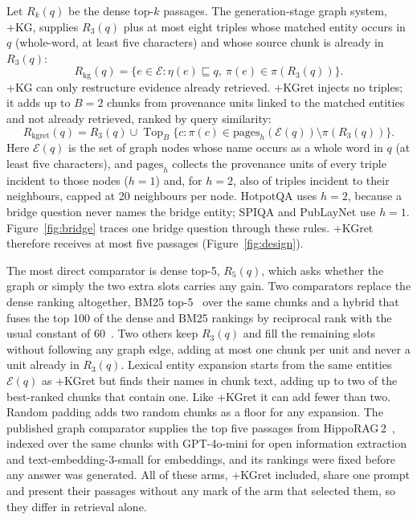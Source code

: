 \documentclass[preprint,12pt]{elsarticle}
\begin{document}
Let $R_k(q)$ be the dense top-$k$ passages. The generation-stage graph system,
+KG, supplies $R_3(q)$ plus at most eight triples whose matched entity occurs in
$q$ (whole-word, at least five characters) and whose source chunk is already
in $R_3(q)$:
\begin{equation}
R_{\text{kg}}(q)=\bigl\{e\in\mathcal{E}:\eta(e)\sqsubseteq q,\ \pi(e)\in\pi(R_3(q))\bigr\}.
\end{equation}
+KG can only restructure evidence already retrieved. +KGret injects no triples;
it adds up to $B=2$ chunks from provenance units linked to the matched
entities and not already retrieved, ranked by query similarity:
\begin{equation}
\label{eq:kgret}
R_{\text{kgret}}(q)=R_3(q)\cup\operatorname{Top}_{B}\bigl\{c:\pi(c)\in\mathrm{pages}_h(\mathcal{E}(q))\setminus\pi(R_3(q))\bigr\}.
\end{equation}
Here $\mathcal{E}(q)$ is the set of graph nodes whose name occurs as a whole
word in $q$ (at least five characters), and $\mathrm{pages}_h$ collects the
provenance units of every triple incident to those nodes ($h=1$) and, for
$h=2$, also of triples incident to their neighbours, capped at 20 neighbours
per node. HotpotQA uses $h=2$, because a bridge question never names the
bridge entity; SPIQA and PubLayNet use $h=1$.
Figure~\ref{fig:bridge} traces one bridge question through these rules.
+KGret therefore receives at most five passages (Figure~\ref{fig:design}).



The most direct comparator is dense top-5, $R_5(q)$, which asks whether the
graph or simply the two extra slots carries any gain. Two comparators replace
the dense ranking altogether, BM25 top-5~\cite{robertson2009bm25} over the
same chunks and a hybrid that fuses the top 100 of the dense and BM25 rankings
by reciprocal rank with the usual constant of 60~\cite{cormack2009rrf}. Two
others keep $R_3(q)$ and fill the remaining slots without following any graph
edge, adding at most one chunk per unit and never a unit already in $R_3(q)$.
Lexical entity expansion starts from the same entities $\mathcal{E}(q)$ as
+KGret but finds their names in chunk text, adding up to two of the
best-ranked chunks that contain one. Like +KGret it can add fewer than two.
Random padding adds two random chunks as a floor for any expansion. The
published graph comparator supplies the top five passages from
HippoRAG\,2~\cite{gutierrez2025hipporag2}, indexed over the same chunks with
GPT-4o-mini for open information extraction and text-embedding-3-small for
embeddings, and its rankings were fixed before any answer was generated. All of these arms, +KGret included,
share one prompt and present their passages without any mark of the arm that
selected them, so they differ in retrieval alone.
\end{document}
